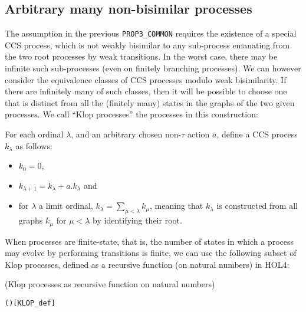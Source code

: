 \subsection{Arbitrary many non-bisimilar processes}

The assumption in the  previous \texttt{PROP3_COMMON} requires the
existence of a special CCS process, which is not weakly bisimilar to
any sub-process emanating from the two root processes by weak
transitions. In the worst case, there may be infinite such
sub-processes (even on finitely branching processes).
We can however consider  the equivalence classes of CCS processes 
modulo weak bisimilarity.
If there are infinitely many of such classes, 
then it will be 
possible to choose one  that is distinct from all the (finitely many) states in the
graphs of the two given processes.  
 We call  ``Klop processes''  the processes in this construction:
\begin{definition}
For each ordinal $\lambda$, and an arbitrary chosen non-$\tau$ action $a$,
define a CCS process $k_\lambda$ as follows:
\begin{itemize}
\item $k_0 = 0$,
\item $k_{\lambda+1} = k_\lambda + a.k_\lambda$ and
\item for $\lambda$ a limit ordinal, $k_\lambda = \sum_{\mu < \lambda}
  k_\mu$, meaning that $k_\lambda$ is constructed from all graphs
  $k_\mu$ for $\mu < \lambda$ by identifying their root.
\end{itemize}
\end{definition}
When processes are finite-state, that is,
the number of  states in which a process may evolve by performing
transitions is finite, 
we can use  the following subset of Klop processes, 
defined as a recursive function (on natural numbers) in HOL4:
\begin{definition}{(Klop processes as recursive function on natural numbers)}
\begin{alltt}
   \HOLSymConst{=} 
  ( ) \HOLSymConst{=}    \HOLSymConst{\ensuremath{+}}    \hfill{[KLOP_def]}
\end{alltt}
\end{definition}

